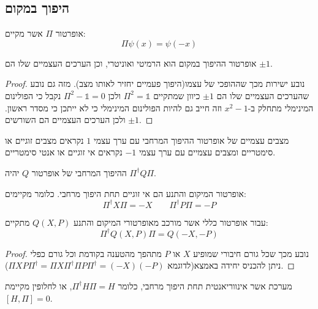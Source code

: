 \documentclass{tstextbook}
\begin{document}
\subsection{היפוך במקום}

\begin{definition}
אופרטור \(\Pi\) אשר מקיים:
$$\Pi \psi(x)=\psi(-x)$$

\end{definition}
\begin{proposition}
אופרטור ההיפוך במקום הוא הרמיטי ואוניטרי, וכן הערכים העצמיים שלו הם \(\pm 1\).

\end{proposition}
\begin{proof}
נובע ישירות מכך שההופכי של עצמו(היפוך פעמיים יחזיר לאותו מצב). מזה גם נובע שהערכים העצמיים שלו הם \(\pm 1\) כיוון שמתקיים \(\Pi^{2}=\mathbb{1}\) ולכן \(\Pi^{2}-\mathbb{1}=0\) נקבל כי הפולינום המינימלי מתחלק ב-\(x^{2}-1\) וזה חייב גם להיות הפולינום המינימלי כי לא ייתכן כי מסדר ראשון. ולכן הערכים העצמיים הם השורשים \(\pm 1\).

\end{proof}
\begin{definition}
מצבים עצמיים של אופרטור ההיפוך המרחבי עם ערך עצמי \(1\) נקראים מצבים זוגיים או סימטריים ומצבים עצמיים עם ערך עצמי \(-1\) נקראים אי זוגיים או אנטי סימטריים.

\end{definition}
\begin{proposition}
ההיפוך המרחבי של אופרטור \(Q\) יהיה \(\Pi ^{\dagger}Q \Pi\). 

\end{proposition}
\begin{proposition}
אופרטור המיקום והתנע הם אי זוגיים תחת היפוך מרחבי. כלומר מקיימים:
$$\Pi ^{\dagger} X\Pi=-X\qquad \Pi ^{\dagger}P \Pi=-P$$

\end{proposition}
\begin{corollary}
עבור אופרטור כללי אשר מורכב מאופרטורי המיקום והתנע \(Q(X,P)\) מתקיים:
$$\Pi ^{\dagger}Q(X,P)\Pi = Q(-X,-P)$$

\end{corollary}
\begin{proof}
נובע מכך שכל גורם חיבורי שמופיע \(X\) או \(P\) מתהפך מהטענה בקודמת וכל גורם כפלי ניתן להכניס יחידה באמצא(לדוגמא \(\Pi XP \Pi ^{\dagger}=\Pi X\Pi ^{\dagger}\Pi P \Pi ^{\dagger}=(-X)(-P)\)).

\end{proof}
\begin{definition}
מערכת אשר אינווריאנטית תחת היפוך מרחבי, כלומר \(\Pi ^{\dagger}H\Pi=H\), או לחלופין מקיימת \(\left[ H,\Pi \right]=0\).

\end{definition}
\end{document}
